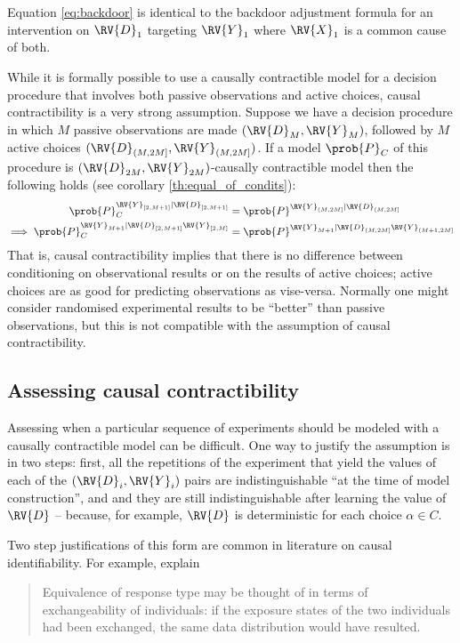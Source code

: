 Equation \ref{eq:backdoor} is identical to the backdoor adjustment formula for an intervention on $\RV{D}_1$ targeting $\RV{Y}_1$ where $\RV{X}_1$ is a common cause of both.

While it is formally possible to use a causally contractible model for a decision procedure that involves both passive observations and active choices, causal contractibility is a very strong assumption. Suppose we have a decision procedure in which $M$ passive observations are made $(\RV{D}_M,\RV{Y}_M)$, followed by $M$ active choices $(\RV{D}_{(M,2M]},\RV{Y}_{(M,2M]})$. If a model $\prob{P}_C$ of this procedure is $(\RV{D}_{2M},\RV{Y}_{2M})$-causally contractible model then the following holds (see corollary \ref{th:equal_of_condits}):
\begin{align}
    \prob{P}^{\RV{Y}_{[2,M+1]}|\RV{D}_{[2,M+1]}}_C &= \prob{P}^{\RV{Y}_{(M,2M]}|\RV{D}_{(M,2M]}}\\
    \implies \prob{P}^{\RV{Y}_{M+1}|\RV{D}_{[2,M+1]}\RV{Y}_{[2,M]}}_C &= \prob{P}^{\RV{Y}_{M+1}|\RV{D}_{(M,2M]}\RV{Y}_{(M+1,2M]}}
\end{align}
That is, causal contractibility implies that there is no difference between conditioning on observational results or on the results of active choices; active choices are as good for predicting observations as vise-versa. Normally one might consider randomised experimental results to be ``better'' than passive observations, but this is not compatible with the assumption of causal contractibility.

\subsection{Assessing causal contractibility}\label{ssec:assessing}

Assessing when a particular sequence of experiments should be modeled with a causally contractible model can be difficult. One way to justify the assumption is in two steps: first, all the repetitions of the experiment that yield the values of each of the $(\RV{D}_i,\RV{Y}_i)$ pairs are indistinguishable ``at the time of model construction'', and and they are still indistinguishable after learning the value of $\RV{D}$ -- because, for example, $\RV{D}$ is deterministic for each choice $\alpha\in C$. 

Two step justifications of this form are common in literature on causal identifiability. For example, \citet{greenland_identifiability_1986} explain

\begin{quote}
    Equivalence of response type may be thought of in terms of exchangeability of individuals: if the exposure states of the two individuals had been exchanged, the same data distribution would have resulted.
\end{quote}

